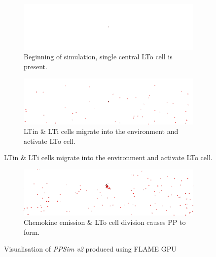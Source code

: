 \documentclass{UoYCSproject}
\begin{document}
\begin{figure}[htpb]
\begin{subfigure}{\textwidth}
\centering
\includegraphics[width=\textwidth]{Appendix/Sim/Start}
\caption{Beginning of simulation, single central \gls{LTo} cell is present.}
\label{fig:sim_start}
\end{subfigure}

\begin{subfigure}{\textwidth}
\centering
\includegraphics[width=\textwidth]{Appendix/Sim/Migration}
\caption{\gls{LTin} \& \gls{LTi} cells migrate into the environment and activate \gls{LTo} cell.}
\label{fig:sim_contact}
\end{subfigure}
\end{figure}

\newpage

\begin{figure}[htpb]\ContinuedFloat
\begin{subfigure}{\textwidth}
\centering
\includegraphics[width=\textwidth]{Appendix/Sim/Patch}
\caption{Chemokine emission \& \gls{LTo} cell division causes \gls{PP} to form.}
\label{fig:sim_patch}
\end{subfigure}

\caption{Visualisation of \textit{PPSim v2} produced using \gls{FLAME GPU}}
\label{fig:ppsimv2_vis}
\end{figure}
\end{document}
